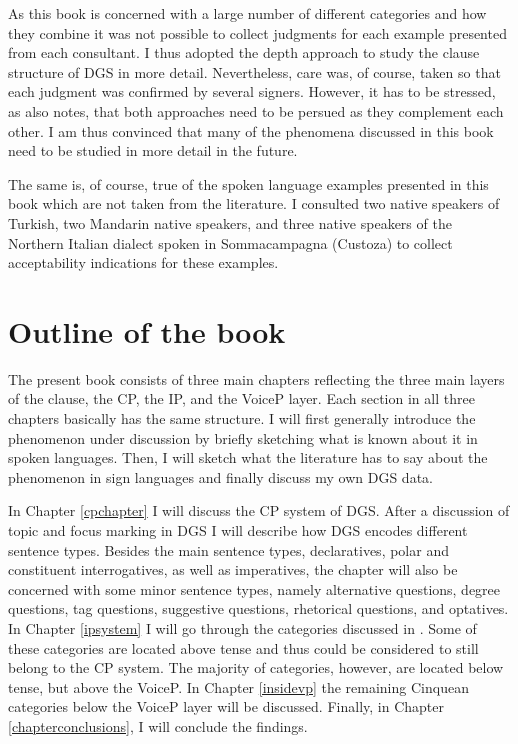 As this book is concerned with a large number of different categories and how they combine it was not possible to collect judgments for each example presented from each consultant. I thus adopted the depth approach to study the clause structure of DGS in more detail. Nevertheless, care was, of course, taken so that each judgment was confirmed by several signers. However, it has to be stressed, as \citet{zyman2012two} also notes, that both approaches need to be persued as they complement each other. I am thus convinced that many of the phenomena discussed in this book need to be studied in more detail in the future. 

The same is, of course, true of the spoken language examples presented in this book which are not taken from the literature. I consulted two native speakers of Turkish, two Mandarin native speakers, and three native speakers of the Northern Italian dialect spoken in Sommacampagna (Custoza) to collect acceptability indications for these examples.



\section{Outline of the book}\label{outlinesection}
The present book consists of three main chapters reflecting the three main layers of the clause, the CP, the IP, and the VoiceP layer. Each section in all three chapters basically has the same structure. I will first generally introduce the phenomenon under discussion by briefly sketching what is known about it in spoken languages. Then, I will sketch what the literature has to say about the phenomenon in sign languages and finally discuss my own DGS data. 

In Chapter \ref{cpchapter} I will discuss the CP system of DGS. After a discussion of topic and focus marking in DGS I will describe how DGS encodes different sentence types. Besides the main sentence types, declaratives, polar and constituent interrogatives, as well as imperatives, the chapter will also be concerned with some minor sentence types, namely alternative questions, degree questions, tag questions, suggestive questions, rhetorical questions, and optatives. In Chapter \ref{ipsystem} I will go through the categories discussed in \citet{cinque1999adverbs, cinque2006restructuring}. Some of these categories are located above tense and thus could be considered to still belong to the CP system. The majority of categories, however, are located below tense, but above the VoiceP. In Chapter \ref{insidevp} the remaining Cinquean categories below the VoiceP layer will be discussed. Finally, in Chapter \ref{chapterconclusions}, I will conclude the findings.

